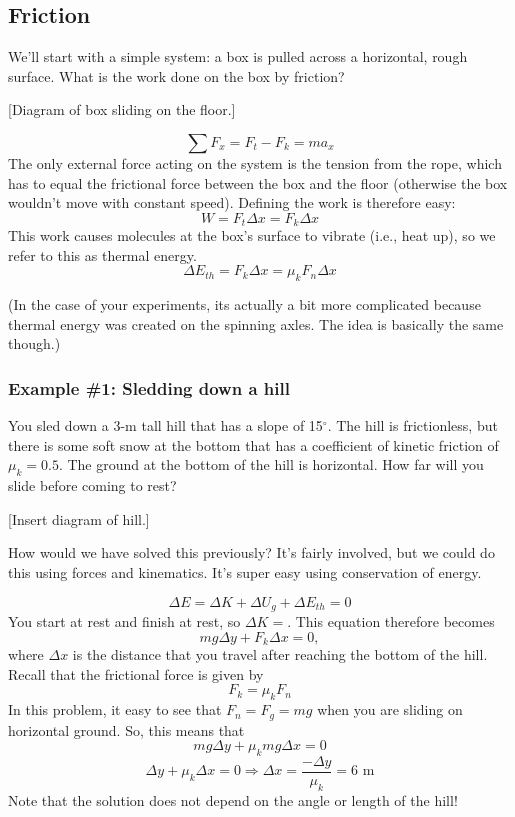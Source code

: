 \subsection{Friction}
We'll start with a simple system: a box is pulled across a horizontal, rough surface. What is the work done on the box by friction?

\pagebreak

[Diagram of box sliding on the floor.]
\vspace{4cm}

$$\sum F_x=F_t-F_k=ma_x$$
The only external force acting on the system is the tension from the rope, which has to equal the frictional force between the box and the floor (otherwise the box wouldn't move with constant speed). Defining the work is therefore easy:
$$W=F_t\Delta{x}=F_k\Delta{x}$$
This work causes molecules at the box's surface to vibrate (i.e., heat up), so we refer to this as thermal energy.
$$\boxed{\Delta{E_{th}}=F_k\Delta{x}=\mu_kF_n\Delta{x}}$$

(In the case of your experiments, its actually a bit more complicated because thermal energy was created on the spinning axles. The idea is basically the same though.)

\subsubsection*{Example \#1: Sledding down a hill}
You sled down a 3-m tall hill that has a slope of 15$^\circ$. The hill is frictionless, but there is some soft snow at the bottom that has a coefficient of kinetic friction of $\mu_k=0.5$. The ground at the bottom of the hill is horizontal. How far will you slide before coming to rest?

[Insert diagram of hill.]
\vspace{5cm}

How would we have solved this previously? It's fairly involved, but we could do this using forces and kinematics. It's super easy using conservation of energy.

$$\Delta{E}=\Delta{K}+\Delta{U_g}+\Delta{E_{th}}=0$$
You start at rest and finish at rest, so $\Delta{K}=$. This equation therefore becomes
$$mg\Delta{y}+F_k\Delta{x}=0,$$
where $\Delta{x}$ is the distance that you travel after reaching the bottom of the hill. Recall that the frictional force is given by
$$F_k=\mu_kF_n$$
In this problem, it easy to see that $F_n=F_g=mg$ when you are sliding on horizontal ground. So, this means that
$$mg\Delta{y}+\mu_k mg\Delta{x}=0$$
$$\Delta{y}+\mu_k \Delta{x}=0\Rightarrow \boxed{\Delta{x}=\frac{-\Delta{y}}{\mu_k}=6\mbox{ m}}$$
Note that the solution does not depend on the angle or length of the hill!

